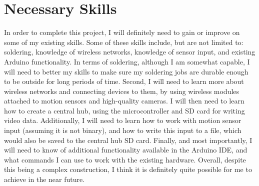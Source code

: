 \documentclass[conference]{IEEEtran}
\begin{document}
\vspace{10pt}

\section{Necessary Skills}

In order to complete this project, I will definitely need to gain or improve on some of my existing skills. Some of these skills include, but are not limited to: soldering, knowledge of wireless networks, knowledge of sensor input, and existing Arduino functionality. In terms of soldering, although I am somewhat capable, I will need to better my skills to make sure my soldering jobs are durable enough to be outside for long periods of time. Second, I will need to learn more about wireless networks and connecting devices to them, by using wireless modules attached to motion sensors and high-quality cameras. I will then need to learn how to create a central hub, using the microcontroller and SD card for writing video data. Additionally, I will need to learn how to work with motion sensor input (assuming it is not binary), and how to write this input to a file, which would also be saved to the central hub SD card. Finally, and most importantly, I will need to know of additional functionality available in the Arduino IDE, and what commands I can use to work with the existing hardware. Overall, despite this being a complex construction, I think it is definitely quite possible for me to achieve in the near future.
\end{document}
